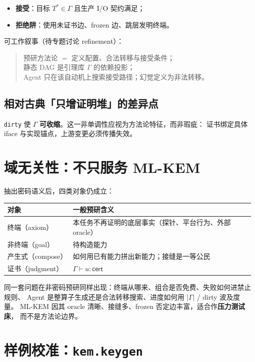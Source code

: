 \documentclass[UTF8,a4paper,11pt]{ctexart}
\begin{document}
\begin{itemize}
  \item \textbf{接受}：目标 $T^*\in\Gamma$ 且生产 I/O 契约满足；
  \item \textbf{拒绝阱}：使用未证书边、frozen 边、跳层发明终端。
\end{itemize}

可工作叙事（待专题讨论 refinement）：
\begin{quote}
预研方法论 $=$ 定义配置、合法转移与接受条件；\\
静态 DAG 是引理库 $\Gamma$ 的依赖投影；\\
Agent 只在该自动机上搜索接受路径；幻觉定义为非法转移。
\end{quote}

\subsection{相对古典「只增证明堆」的差异点}
\texttt{dirty} 使 $\Gamma$ \textbf{可收缩}。这一非单调性应视为方法论特征，而非瑕疵：
证书绑定具体 iface 与实现锚点，上游变更必须传播失效。

\section{域无关性：不只服务 ML-KEM}

抽出密码语义后，四类对象仍成立：

\begin{table}[h]
  \centering
  \begin{tabular}{@{}ll@{}}
    \toprule
    对象 & 一般预研含义 \\
    \midrule
    终端（axiom） & 本任务不再证明的底层事实（探针、平台行为、外部 oracle） \\
    非终端（goal） & 待构造能力 \\
    产生式（compose） & 如何用已有能力拼出新能力；接缝是一等公民 \\
    证书（judgment） & $\Gamma \vdash u:\mathsf{cert}$ \\
    \bottomrule
  \end{tabular}
\end{table}

同一套问题在非密码预研同样出现：终端从哪来、组合是否免费、失败如何进禁止规则、
Agent 是整算子生成还是合法转移搜索、进度如何用 $|\Gamma|$ / dirty 波及度量。
ML-KEM 因其 oracle 清晰、接缝多、frozen 否定边丰富，适合作\textbf{压力测试床}，
而不是方法论边界。

\section{样例校准：\texttt{kem.keygen}}
\end{document}
